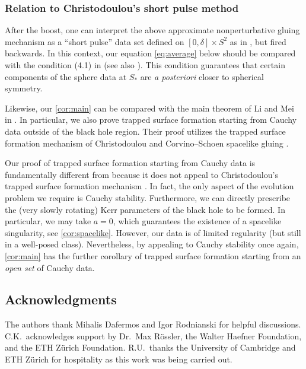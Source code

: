 \documentclass[10pt]{article}
\numberwithin{equation}{section}
\theoremstyle{plain}
\theoremstyle{definition}
\begin{document}
\subsubsection{Relation to Christodoulou's short pulse method}\label{sec:short-pulse-intro}

After the boost, one can  interpret the above approximate nonperturbative gluing mechanism as a ``short pulse'' data set defined on $[0,\delta]\times S^2$ as in \cite{Christo09}, but fired backwards. In this context, our equation \eqref{eq:average} below should be compared with the condition (4.1) in \cite{LiYu} (see also \cite{LiMei, Athanasiou2020}). This condition guarantees that certain components of the sphere data at $S_*$ are \emph{a posteriori} closer to spherical symmetry.

Likewise, our \cref{cor:main} can be compared with the main theorem of Li and Mei in \cite{LiMei}. In particular, we also prove trapped surface formation starting from Cauchy data outside of the black hole region. Their proof utilizes the trapped surface formation mechanism of Christodoulou \cite{Christo09} and Corvino--Schoen spacelike gluing \cite{CorvinoSchoen}. 

Our proof of trapped surface formation starting from Cauchy data is fundamentally different from \cite{LiMei} because it does not appeal to Christodoulou's trapped surface formation mechanism \cite{Christo09}. In fact, the only aspect of the evolution problem we require is Cauchy stability. Furthermore, we can directly prescribe the (very slowly rotating) Kerr parameters of the black hole to be formed. In particular, we may take $a=0$, which guarantees the existence of a spacelike singularity, see \cref{cor:spacelike}. However, our data is of limited regularity (but still in a well-posed class). Nevertheless, by appealing to Cauchy stability once again, \cref{cor:main} has the further corollary of trapped surface formation starting from an \emph{open set} of Cauchy data. 

 \subsection*{Acknowledgments}

The authors thank Mihalis Dafermos and Igor Rodnianski for helpful discussions. C.K.~acknowledges support by Dr.~Max R\"ossler, the Walter Haefner Foundation, and the ETH Z\"urich Foundation.  R.U.~thanks the University of Cambridge and ETH Z\"urich for hospitality as this work was being carried out. 
\end{document}
